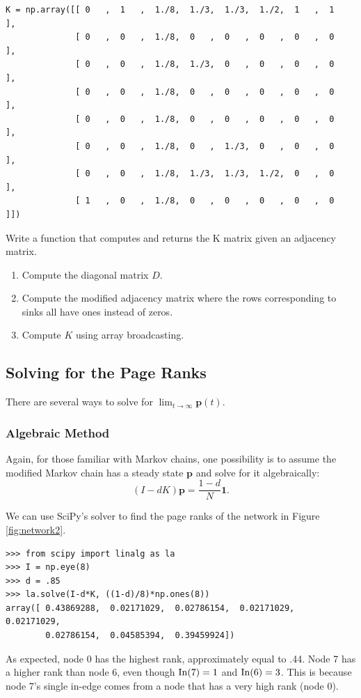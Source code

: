 \begin{lstlisting}
K = np.array([[ 0   ,  1   ,  1./8,  1./3,  1./3,  1./2,  1   ,  1   ],
              [ 0   ,  0   ,  1./8,  0   ,  0   ,  0   ,  0   ,  0   ],
              [ 0   ,  0   ,  1./8,  1./3,  0   ,  0   ,  0   ,  0   ],
              [ 0   ,  0   ,  1./8,  0   ,  0   ,  0   ,  0   ,  0   ],
              [ 0   ,  0   ,  1./8,  0   ,  0   ,  0   ,  0   ,  0   ],
              [ 0   ,  0   ,  1./8,  0   ,  1./3,  0   ,  0   ,  0   ],
              [ 0   ,  0   ,  1./8,  1./3,  1./3,  1./2,  0   ,  0   ],
              [ 1   ,  0   ,  1./8,  0   ,  0   ,  0   ,  0   ,  0   ]])
\end{lstlisting}
\begin{problem}
Write a function that computes and returns the K matrix given an adjacency matrix.
\begin{enumerate}
\item Compute the diagonal matrix $D$.
\item Compute the modified adjacency matrix where the rows corresponding to sinks all have ones instead of zeros.
\item Compute $K$ using array broadcasting.
\end{enumerate}
\end{problem}


\subsection*{Solving for the Page Ranks}
There are several ways to solve for $\lim_{t \to \infty} \mathbf{p}(t)$.
\subsubsection*{Algebraic Method}
Again, for those familiar with Markov chains, one possibility is to assume the modified Markov chain has a steady state $\mathbf{p}$ and solve for it algebraically:
\begin{equation}\label{equ:matrix_solve}
(I-dK)\mathbf{p} = \frac{1-d}{N} \mathbf{1}.
\end{equation}

We can use SciPy's solver to find the page ranks of the network in Figure \ref{fig:network2}.
\begin{lstlisting}
>>> from scipy import linalg as la
>>> I = np.eye(8)
>>> d = .85
>>> la.solve(I-d*K, ((1-d)/8)*np.ones(8))
array([ 0.43869288,  0.02171029,  0.02786154,  0.02171029,  0.02171029,
        0.02786154,  0.04585394,  0.39459924])
\end{lstlisting}
As expected, node 0 has the highest rank, approximately equal to .44.
Node 7 has a higher rank than node 6, even though $\operatorname{In}(7)=1$ and $\operatorname{In}(6)=3$.
This is because node 7's single in-edge comes from a node that has a very high rank (node 0).

